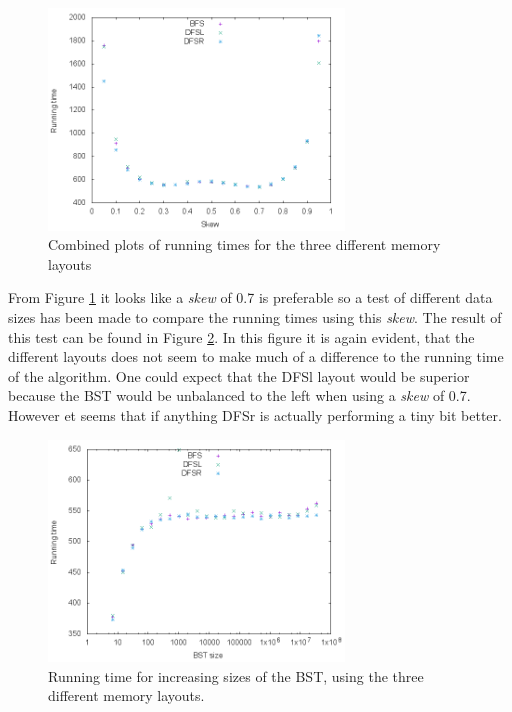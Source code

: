 \documentclass{article}
\begin{document}
\begin{figure}[H]
	\centering
	\includegraphics[width=0.7\textwidth]{figures/combined_running_time}
	\caption{Combined plots of running times for the three different memory layouts}
	\label{fig:combined_running_time}
\end{figure}

From Figure \ref{fig:combined_running_time} it looks like a \textit{skew} of 0.7 is preferable so a test of different data sizes has been made to compare the running times using this \textit{skew}. The result of this test can be found in Figure \ref{fig:combined_running_time_07}. In this figure it is again evident, that the different layouts does not seem to make much of a difference to the running time of the algorithm. One could expect that the DFSl layout would be superior because the BST would be unbalanced to the left when using a \textit{skew} of 0.7. However et seems that if anything DFSr is actually performing a tiny bit better.

\begin{figure}[H]
	\centering
	\includegraphics[width=0.7\textwidth]{figures/combined_running_time_07}
	\caption{Running time for increasing sizes of the BST, using the three different memory layouts.}
	\label{fig:combined_running_time_07}
\end{figure}
\end{document}
